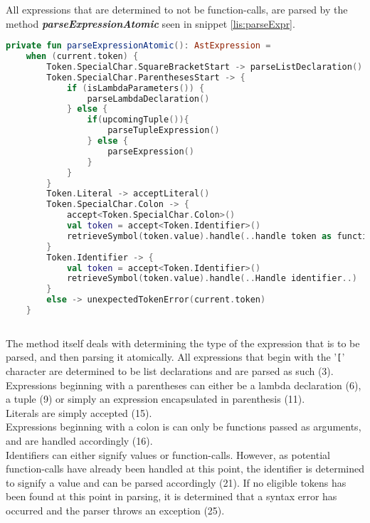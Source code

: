 All expressions that are determined to not be function-calls, are parsed by the method \textbf{\textit{parseExpressionAtomic}} seen in snippet \ref{lis:parseExpr}.

\begin{lstlisting}[language=Kotlin,label=lis:parseExpr,caption=A simplified version of the parseExpressionAtomic method from the parser.]
private fun parseExpressionAtomic(): AstExpression =
    when (current.token) {
        Token.SpecialChar.SquareBracketStart -> parseListDeclaration()
        Token.SpecialChar.ParenthesesStart -> {
            if (isLambdaParameters()) {
                parseLambdaDeclaration()
            } else {
                if(upcomingTuple()){
                    parseTupleExpression()
                } else {
                    parseExpression()
                }
            }
        }
        Token.Literal -> acceptLiteral()
        Token.SpecialChar.Colon -> {
        	accept<Token.SpecialChar.Colon>()
        	val token = accept<Token.Identifier>()
        	retrieveSymbol(token.value).handle(..handle token as function..)
        }
        Token.Identifier -> {
            val token = accept<Token.Identifier>()
            retrieveSymbol(token.value).handle(..Handle identifier..)
        }
        else -> unexpectedTokenError(current.token)
    }
            
\end{lstlisting}

The method itself deals with determining the type of the expression that is to be parsed, and then parsing it atomically.
All expressions that begin with the '\texttt{[}' character are determined to be list declarations and are parsed as such (3).\\
Expressions beginning with a parentheses can either be a lambda declaration (6), a tuple (9) or simply an expression encapsulated in parenthesis (11).\\
Literals are simply accepted (15).\\
Expressions beginning with a colon is can only be functions passed as arguments, and are handled accordingly (16).\\
Identifiers can either signify values or function-calls.
However, as potential function-calls have already been handled at this point, the identifier is determined to signify a value and can be parsed accordingly (21).
If no eligible tokens has been found at this point in parsing, it is determined that a syntax error has occurred and the parser throws an exception (25).


